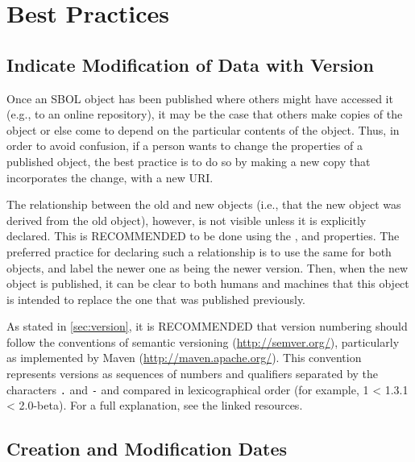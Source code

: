 \section{Best Practices}
\label{sec:bestpractices}
\subsection{Indicate Modification of Data with Version}

Once an SBOL object has been published where others might have accessed it (e.g., to an online repository), it may be the case that others make copies of the object or else come to depend on the particular contents of the object.
Thus, in order to avoid confusion, if a person wants to change the properties of a published object, the best practice is to do so by making a new copy that incorporates the change, with a new URI.

The relationship between the old and new objects (i.e., that the new object was derived from the old object), however, is not visible unless it is explicitly declared.
This is RECOMMENDED to be done using the , and  properties.
The preferred practice for declaring such a relationship is to use the same  for both objects, and label the newer one as being the newer version.
Then, when the new object is published, it can be clear to both humans and machines that this object is intended to replace the one that was published previously.

As stated in \ref{sec:version},  it is RECOMMENDED that version numbering should follow the conventions of semantic versioning (\url{http://semver.org/}), particularly as implemented by Maven (\url{http://maven.apache.org/}).
This convention represents versions as sequences of numbers and qualifiers separated by the characters {\tt .} and {\tt -} and compared in lexicographical order (for example, 1 < 1.3.1 < 2.0-beta).
For a full explanation, see the linked resources.


\subsection{Creation and Modification Dates}

